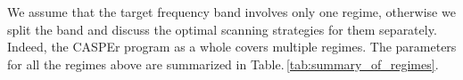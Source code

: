 
We assume that the target frequency band involves only one regime, otherwise we split the band and discuss the optimal scanning strategies for them separately. Indeed, the CASPEr program as a whole covers multiple regimes.
The parameters for all the regimes above are summarized in Table.\,\ref{tab:summary_of_regimes}. 
